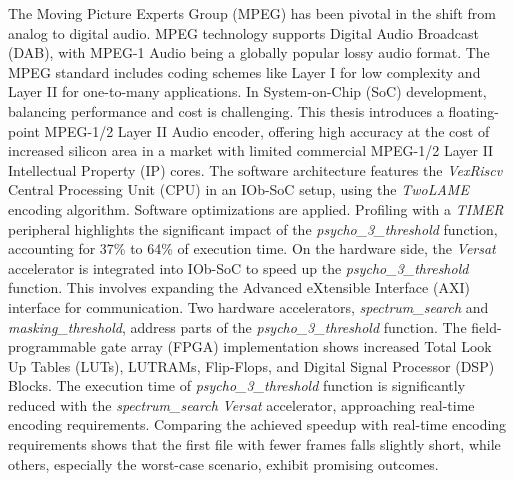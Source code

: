\hspace{0.4cm} The Moving Picture Experts Group (MPEG) has been pivotal in the shift from analog to digital audio. MPEG technology supports Digital Audio Broadcast (DAB), with MPEG-1 Audio being a globally popular lossy audio format. The MPEG standard includes coding schemes like Layer I for low complexity and Layer II for one-to-many applications.
In System-on-Chip (SoC) development, balancing performance and cost is challenging. This thesis introduces a floating-point MPEG-1/2 Layer II Audio encoder, offering high accuracy at the cost of increased silicon area in a market with limited commercial MPEG-1/2 Layer II Intellectual Property (IP) cores.
The software architecture features the \textit{VexRiscv} Central Processing Unit (CPU) in an IOb-SoC setup, using the \textit{TwoLAME} encoding algorithm. Software optimizations are applied. Profiling with a \textit{TIMER} peripheral highlights the significant impact of the \textit{psycho\_3\_threshold} function, accounting for 37\% to 64\% of execution time.
On the hardware side, the \textit{Versat} accelerator is integrated into IOb-SoC to speed up the \textit{psycho\_3\_threshold} function. This involves expanding the Advanced eXtensible Interface (AXI) interface for communication. Two hardware accelerators, \textit{spectrum\_search} and \textit{masking\_threshold}, address parts of the \textit{psycho\_3\_threshold} function. The field-programmable gate array (FPGA) implementation shows increased Total Look Up Tables (LUTs), LUTRAMs, Flip-Flops, and Digital Signal Processor (DSP) Blocks.
The execution time of \textit{psycho\_3\_threshold} function is significantly reduced with the \textit{spectrum\_search} \textit{Versat} accelerator, approaching real-time encoding requirements.
Comparing the achieved speedup with real-time encoding requirements shows that the first file with fewer frames falls slightly short, while others, especially the worst-case scenario, exhibit promising outcomes.